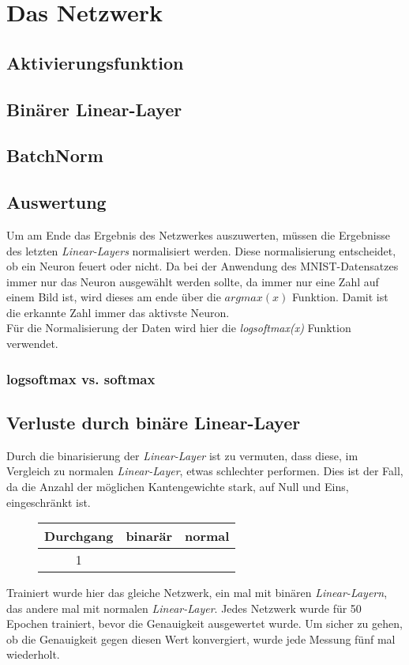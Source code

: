 \chapter{Das Netzwerk}
\section{Aktivierungsfunktion}
\section{Binärer Linear-Layer}
\section{BatchNorm}
\section{Auswertung}
Um am Ende das Ergebnis des Netzwerkes auszuwerten, müssen die Ergebnisse des letzten \textit{Linear-Layers} normalisiert werden. Diese normalisierung entscheidet, ob ein Neuron feuert oder nicht. Da bei der Anwendung des MNIST-Datensatzes immer nur das Neuron ausgewählt werden sollte, da immer nur eine Zahl auf einem Bild ist, wird dieses am ende über die $argmax(x)$ Funktion. Damit ist die erkannte Zahl immer das aktivste Neuron.\\
Für die Normalisierung der Daten wird hier die \textit{logsoftmax(x)} Funktion verwendet.
\subsection{logsoftmax vs. softmax}
\section{Verluste durch binäre Linear-Layer}
Durch die binarisierung der \textit{Linear-Layer} ist zu vermuten, dass diese, im Vergleich zu normalen \textit{Linear-Layer}, etwas schlechter performen. Dies ist der Fall, da die Anzahl der möglichen Kantengewichte stark, auf Null und Eins, eingeschränkt ist. 
\begin{figure}[h]
	\centering
	\begin{tabular}{|c|c|c|}\hline
		Durchgang&binarär&normal\\\hline
		1&
	\end{tabular}
\end{figure}


Trainiert wurde hier das gleiche Netzwerk, ein mal mit binären \textit{Linear-Layern}, das andere mal mit normalen \textit{Linear-Layer}. Jedes Netzwerk wurde für 50 Epochen trainiert, bevor die Genauigkeit ausgewertet wurde. Um sicher zu gehen, ob die Genauigkeit gegen diesen Wert konvergiert, wurde jede Messung fünf mal wiederholt.